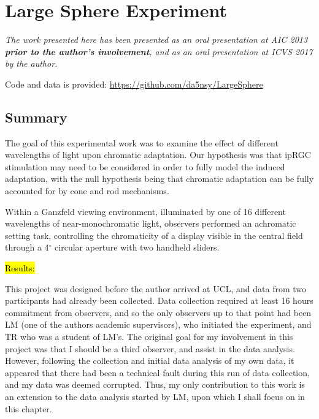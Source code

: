 \chapter{Large Sphere Experiment} %
\label{chap:LargeSphere}

\textit{The work presented here has been presented as an oral presentation at AIC 2013 \citep{macdonald_chromatic_2013} \textbf{prior to the author's involvement}, and as an oral presentation at ICVS 2017 \citep{garside_investigations_2017} by the author.}

Code and data is provided: \url{https://github.com/da5nsy/LargeSphere}

\section{Summary}

The goal of this experimental work was to examine the effect of different wavelengths of light upon chromatic adaptation. Our hypothesis was that \gls{ipRGC} stimulation may need to be considered in order to fully model the induced adaptation, with the null hypothesis being that chromatic adaptation can be fully accounted for by cone and rod mechanisms.

Within a Ganzfeld viewing environment, illuminated by one of 16 different wavelengths of near-monochromatic light, observers performed an achromatic setting task, controlling the chromaticity of a display visible in the central field through a 4$^{\circ}$ circular aperture with two handheld sliders.

\hl{Results:}

This project was designed before the author arrived at \gls{UCL}, and data from two participants had already been collected. Data collection required at least 16 hours commitment from observers, and so the only observers up to that point had been LM (one of the authors academic supervisors), who initiated the experiment, and TR who was a student of LM's. The original goal for my involvement in this project was that I should be a third observer, and assist in the data analysis. However, following the collection and initial data analysis of my own data, it appeared that there had been a technical fault during this run of data collection, and my data was deemed corrupted. %
Thus, my only contribution to this work is an extension to the data analysis started by LM, upon which I shall focus on in this chapter.

